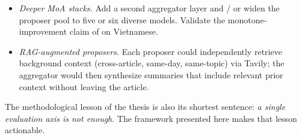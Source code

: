 \begin{itemize}
  \item \textit{Deeper MoA stacks.} Add a second aggregator layer
        and / or widen the proposer pool to five or six diverse
        models. Validate the monotone-improvement claim of
        \cite{Wang2024} on Vietnamese.
  \item \textit{RAG-augmented proposers.} Each proposer could
        independently retrieve background context (cross-article,
        same-day, same-topic) via Tavily; the aggregator would then
        synthesize summaries that include relevant prior context
        without leaving the article.
\end{itemize}

\vspace{0.6em}
\noindent The methodological lesson of the thesis is also its
shortest sentence: \textit{a single evaluation axis is not enough}.
The framework presented here makes that lesson actionable.
